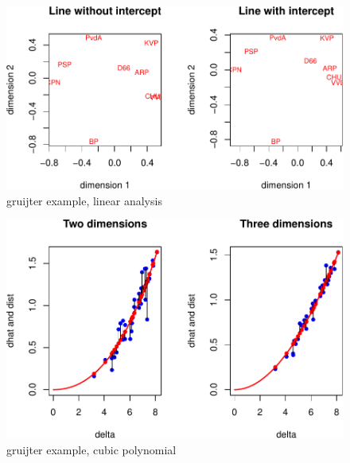 \documentclass[
  12pt,
]{article}
\begin{document}
\begin{figure}

{\centering \includegraphics{smacofBS_files/figure-latex/gruijterlinearconf-1} 

}

\caption{gruijter example, linear analysis}\label{fig:gruijterlinearconf}
\end{figure}

\begin{figure}

{\centering \includegraphics{smacofBS_files/figure-latex/gruijtercubic-1} 

}

\caption{gruijter example, cubic polynomial}\label{fig:gruijtercubic}
\end{figure}
\end{document}
